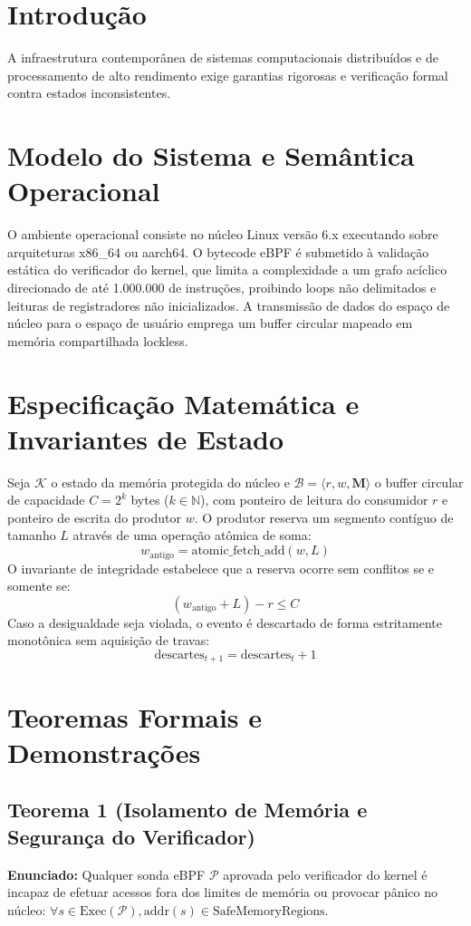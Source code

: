 \documentclass[
  article,
  12pt,
  oneside,
  a4paper,
  english,
  brazil
]{abntex2}
\begin{document}
\section{Introdução}
A infraestrutura contemporânea de sistemas computacionais distribuídos e de processamento de alto rendimento exige garantias rigorosas e verificação formal contra estados inconsistentes.

\section{Modelo do Sistema e Semântica Operacional}
O ambiente operacional consiste no núcleo Linux versão 6.x executando sobre arquiteturas x86_64 ou aarch64. O bytecode eBPF é submetido à validação estática do verificador do kernel, que limita a complexidade a um grafo acíclico direcionado de até 1.000.000 de instruções, proibindo loops não delimitados e leituras de registradores não inicializados. A transmissão de dados do espaço de núcleo para o espaço de usuário emprega um buffer circular mapeado em memória compartilhada lockless.

\section{Especificação Matemática e Invariantes de Estado}
Seja $\mathcal{K}$ o estado da memória protegida do núcleo e $\mathcal{B} = \langle r, w, \mathbf{M} \rangle$ o buffer circular de capacidade $C = 2^k$ bytes ($k \in \mathbb{N}$), com ponteiro de leitura do consumidor $r$ e ponteiro de escrita do produtor $w$.
O produtor reserva um segmento contíguo de tamanho $L$ através de uma operação atômica de soma:
$$w_{\text{antigo}} = \text{atomic\_fetch\_add}(w, L)$$
O invariante de integridade estabelece que a reserva ocorre sem conflitos se e somente se:
$$(w_{\text{antigo}} + L) - r \le C$$
Caso a desigualdade seja violada, o evento é descartado de forma estritamente monotônica sem aquisição de travas:
$$\text{descartes}_{t+1} = \text{descartes}_t + 1$$

\section{Teoremas Formais e Demonstrações}
\subsection{Teorema 1 (Isolamento de Memória e Segurança do Verificador)}
\textbf{Enunciado:} Qualquer sonda eBPF $\mathcal{P}$ aprovada pelo verificador do kernel é incapaz de efetuar acessos fora dos limites de memória ou provocar pânico no núcleo: $\forall s \in \text{Exec}(\mathcal{P}), \text{addr}(s) \in \text{SafeMemoryRegions}$.
\end{document}
